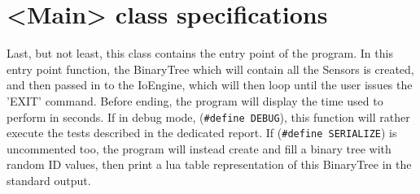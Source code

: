 \documentclass[10pt]{article}
\begin{document}
\section{<Main> class specifications}
Last, but not least, this class contains the entry point of the program. In this entry point function, the BinaryTree which will contain all the Sensors is created, and then passed in to the IoEngine, which will then loop until the user issues the 'EXIT' command. Before ending, the program will display the time used to perform in seconds.
If in debug mode, (\texttt{\#define DEBUG}), this function will rather execute the tests described in the dedicated report. If (\texttt{\#define SERIALIZE}) is uncommented too, the program will instead create and fill a binary tree with random ID values, then print a lua table representation of this BinaryTree in the standard output.
\end{document}

